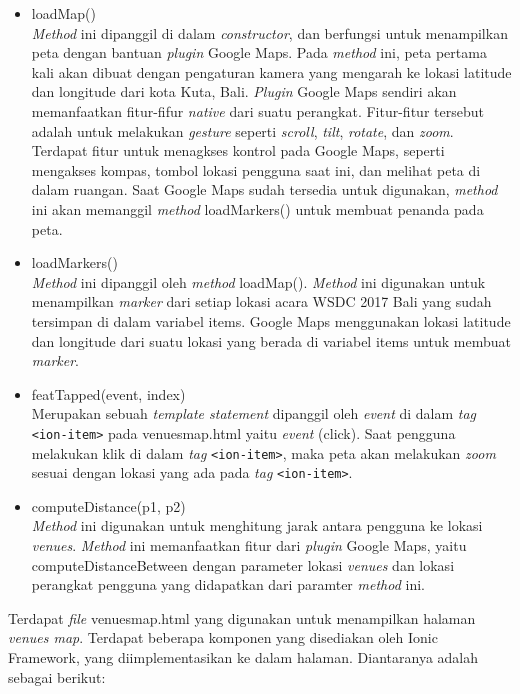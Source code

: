 \begin{enumerate}
\begin{enumerate}
\begin{itemize}
		\item loadMap() \\
		\textit{Method} ini dipanggil di dalam \textit{constructor}, dan berfungsi untuk menampilkan peta dengan bantuan \textit{plugin} Google Maps. Pada \textit{method} ini, peta pertama kali akan dibuat dengan pengaturan kamera yang mengarah ke lokasi latitude dan longitude dari kota Kuta, Bali. 	
		\textit{Plugin} Google Maps sendiri akan memanfaatkan fitur-fifur \textit{native} dari suatu perangkat. Fitur-fitur tersebut adalah untuk melakukan \textit{gesture} seperti \textit{scroll}, \textit{tilt}, \textit{rotate}, dan \textit{zoom}. Terdapat fitur untuk menagkses kontrol pada Google Maps, seperti mengakses kompas, tombol lokasi pengguna saat ini, dan melihat peta di dalam ruangan. Saat Google Maps sudah tersedia untuk digunakan, \textit{method} ini akan memanggil \textit{method} loadMarkers() untuk membuat penanda pada peta.	
		\item loadMarkers() \\
		\textit{Method} ini dipanggil oleh \textit{method} loadMap(). \textit{Method} ini digunakan untuk menampilkan \textit{marker} dari setiap lokasi acara WSDC 2017 Bali yang sudah tersimpan di dalam variabel items. Google Maps menggunakan lokasi latitude dan longitude dari suatu lokasi yang berada di variabel items untuk membuat \textit{marker}.  
		\item featTapped(event, index) \\
		Merupakan sebuah \textit{template statement} dipanggil oleh \textit{event} di dalam \textit{tag} \texttt{<ion-item>} pada venues\textunderscore map.html yaitu \textit{event} (click). Saat pengguna melakukan klik di dalam \textit{tag} \texttt{<ion-item>}, maka peta akan melakukan \textit{zoom} sesuai dengan lokasi yang ada pada \textit{tag} \texttt{<ion-item>}.
		\item computeDistance(p1, p2)\\
		\textit{Method} ini digunakan untuk menghitung jarak antara pengguna ke lokasi \textit{venues}. \textit{Method} ini memanfaatkan fitur dari \textit{plugin} Google Maps, yaitu computeDistanceBetween dengan parameter lokasi \textit{venues} dan lokasi perangkat pengguna yang didapatkan dari paramter \textit{method} ini.
	\end{itemize}
	
	Terdapat \textit{file} venues\textunderscore map.html yang digunakan untuk menampilkan halaman \textit{venues map}. Terdapat beberapa komponen yang disediakan oleh Ionic Framework, yang diimplementasikan ke dalam halaman. Diantaranya adalah sebagai berikut:


\end{enumerate}
\end{enumerate}
